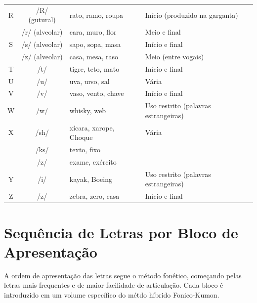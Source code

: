 \begin{table}[h]
\begin{tabular}{|c|c|p{3.5cm}|p{3.5cm}|}
\hline
R & /R/ (gutural) & rato, ramo, roupa & In\'{i}cio (produzido na
garganta) \\
  & /r/ (alveolar) & cara, muro, flor & Meio e final \\
\hline
S & /s/ (alveolar) & sapo, sopa, masa & In\'{i}cio e final \\
  & /z/ (alveolar) & casa, mesa, raso & Meio (entre vogais) \\
\hline
T & /t/ & tigre, teto, mato & In\'{i}cio e final \\
\hline
U & /u/ & uva, urso, sal & V\'{a}ria \\
\hline
V & /v/ & vaso, vento, chave & In\'{i}cio e final \\
\hline
W & /w/ & whisky, web & Uso restrito (palavras estrangeiras) \\
\hline
X & /sh/ & xícara, xarope, Choque & V\'{a}ria \\
  & /ks/ & texto, fixo & \\
  & /z/ & exame, exército & \\
\hline
Y & /i/ & kayak, Boeing & Uso restrito (palavras estrangeiras) \\
\hline
Z & /z/ & zebra, zero, casa & In\'{i}cio e final \\
\hline
\end{tabular}
\end{table}


\chapter{Sequência de Letras por Bloco de Apresentação}

A ordem de apresentação das letras segue o m\'{e}todo fon\'{e}tico,
come\c{c}ando pelas letras mais frequentes e de maior facilidade
de articula\c{c}\~{a}o. Cada bloco \'{e} introduzido em um volume
espec\'{i}fico do m\'{e}tdo h\'{i}brido Fonico-Kumon.

